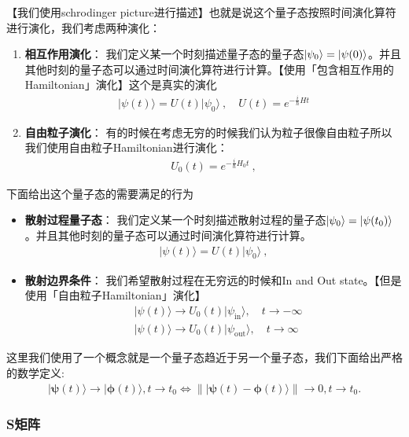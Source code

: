 【我们使用schrodinger picture进行描述】也就是说这个量子态按照时间演化算符进行演化，我们考虑两种演化：
\begin{enumerate}
  \item \textbf{相互作用演化}： 我们定义某一个时刻描述量子态的量子态$ \ket{\psi_0}=
    |\psi(0)\rangle
    $。并且其他时刻的量子态可以通过时间演化算符进行计算。【使用「包含相互作用的Hamiltonian」演化】这个是真实的演化
    \begin{align}
      |\psi(t)\rangle=U(t)|\psi_0\rangle\mathrm{~,} \quad
      U(t)=e^{-\frac{i}{\hbar}Ht}
    \end{align}
  \item \textbf{自由粒子演化}： 有的时候在考虑无穷的时候我们认为粒子很像自由粒子所以我们使用自由粒子Hamiltonian进行演化：
    \begin{align}
      U_0 (t)=e^{-\frac{i}{\hbar}H_0t}\mathrm{~,}
    \end{align}

\end{enumerate}

\bigskip
{}

下面给出这个量子态的需要满足的行为
\begin{itemize}
  \item \textbf{散射过程量子态}： 我们定义某一个时刻描述散射过程的量子态$\ket{\psi_0} =
    |\psi(t_0)\rangle $。并且其他时刻的量子态可以通过时间演化算符进行计算。
    \begin{align}
      |\psi(t)\rangle=U(t)|\psi_0\rangle\mathrm{~,}
    \end{align}
  \item \textbf{散射边界条件}： 我们希望散射过程在无穷远的时候和In and Out
    state。【但是使用「自由粒子Hamiltonian」演化】
    \begin{align}
      &|\psi(t)\rangle\to U_0(t)|\psi_\mathrm{in}\rangle,\quad t\to-\infty\\
      &|\psi(t)\rangle\to U_0(t)|\psi_\mathrm{out}\rangle,\quad t\to\infty
    \end{align}
\end{itemize}
这里我们使用了一个概念就是一个量子态趋近于另一个量子态，我们下面给出严格的数学定义:
\begin{align}
  |\boldsymbol{\psi}(t)\rangle\to|\boldsymbol{\phi}(t)\rangle,t\to
  t_0\Leftrightarrow\||\boldsymbol{\psi}(t)-\boldsymbol{\phi}(t)\rangle\|\to0,t\to
  t_0.
\end{align}

\subsubsection{S矩阵}

